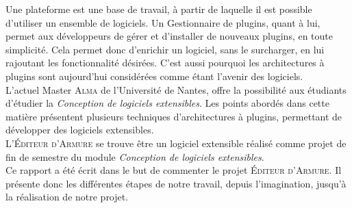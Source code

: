 

Une plateforme est une base de travail, à partir de laquelle il est possible d'utiliser un ensemble de logiciels. Un Gestionnaire de plugins, quant à lui, permet aux développeurs de gérer et d'installer de nouveaux plugins, en toute simplicité. Cela permet donc d'enrichir un logiciel, sans le surcharger, en lui rajoutant les fonctionnalité désirées. C'est aussi pourquoi les architectures à plugins sont aujourd'hui considérées comme étant l'avenir des logiciels. \\

L'actuel Master \textsc{Alma} de l’Université de Nantes, offre la possibilité aux étudiants d'étudier la \textit{Conception de logiciels extensibles}. Les points abordés dans cette matière présentent plusieurs techniques d'architectures à plugins, permettant de développer des logiciels extensibles. \\

L'\textsc{\'Editeur d'Armure} se trouve être un logiciel extensible réalisé comme projet de fin de semestre du module \textit{Conception de logiciels extensibles}.\\

Ce rapport a été écrit dans le but de commenter le projet \textsc{\'Editeur d'Armure}. Il présente donc les différentes étapes de notre travail, depuis l'imagination, jusqu'à la réalisation de notre projet.
